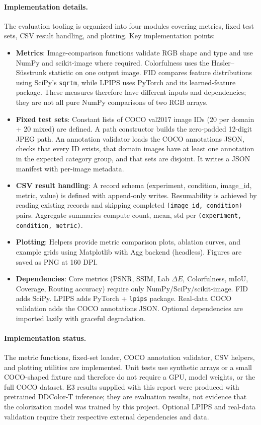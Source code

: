 \documentclass{FastFyp}
\begin{document}
\paragraph{Implementation details.}
The evaluation tooling is organized into four modules covering metrics, fixed test sets, CSV result handling, and plotting. Key implementation points:
\begin{itemize}
    \item \textbf{Metrics}: Image-comparison functions validate RGB shape and type and use NumPy and scikit-image where required. Colorfulness uses the Hasler--S\"usstrunk statistic on one output image. FID compares feature distributions using SciPy's \texttt{sqrtm}, while LPIPS uses PyTorch and its learned-feature package. These measures therefore have different inputs and dependencies; they are not all pure NumPy comparisons of two RGB arrays.
    \item \textbf{Fixed test sets}: Constant lists of COCO val2017 image IDs (20 per domain + 20 mixed) are defined. A path constructor builds the zero-padded 12-digit JPEG path. An annotation validator loads the COCO annotations JSON, checks that every ID exists, that domain images have at least one annotation in the expected category group, and that sets are disjoint. It writes a JSON manifest with per-image metadata.
    \item \textbf{CSV result handling}: A record schema (experiment, condition, image\_id, metric, value) is defined with append-only writes. Resumability is achieved by reading existing records and skipping completed \texttt{(image\_id, condition)} pairs. Aggregate summaries compute count, mean, std per \texttt{(experiment, condition, metric)}.
    \item \textbf{Plotting}: Helpers provide metric comparison plots, ablation curves, and example grids using Matplotlib with Agg backend (headless). Figures are saved as PNG at 160 DPI.
    \item \textbf{Dependencies}: Core metrics (PSNR, SSIM, Lab $\Delta E$, Colorfulness, mIoU, Coverage, Routing accuracy) require only NumPy/SciPy/scikit-image. FID adds SciPy. LPIPS adds PyTorch + \texttt{lpips} package. Real-data COCO validation adds the COCO annotations JSON. Optional dependencies are imported lazily with graceful degradation.
\end{itemize}

\paragraph{Implementation status.}
The metric functions, fixed-set loader, COCO annotation validator, CSV helpers,
and plotting utilities are implemented. Unit tests use synthetic arrays or a
small COCO-shaped fixture and therefore do not require a GPU, model weights,
or the full COCO dataset. E3 results supplied with this report were produced
with pretrained DDColor-T inference; they are evaluation results, not evidence
that the colorization model was trained by this project. Optional LPIPS and
real-data validation require their respective external dependencies and data.
\end{document}
